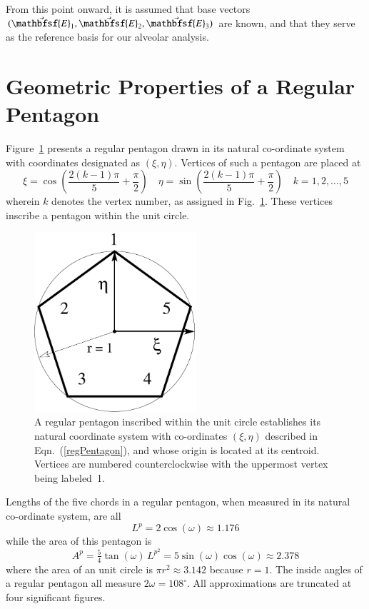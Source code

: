 From this point onward, it is assumed that base vectors $( \vec{\mathbfsf{E}}_1 , \vec{\mathbfsf{E}}_2 , \vec{\mathbfsf{E}}_3 )$ are known, and that they serve as the reference basis for our alveolar analysis.

\section{Geometric Properties of a Regular Pentagon}

Figure~\ref{figRegPentagon} presents a regular pentagon drawn in its natural co-ordinate system with co\-ordinates designated as $(\xi, \eta)$.  Vertices of such a pentagon are placed at
\begin{equation}
	\xi = \cos \left( \frac{2(k-1)\pi}{5} + \frac{\pi}{2} \right) \quad
	\eta = \sin \left( \frac{2(k-1)\pi}{5} + \frac{\pi}{2} \right) \quad
	k = 1, 2, \ldots, 5
	\label{regPentagon}
\end{equation}
wherein $k$ denotes the vertex number, as assigned in Fig.~\ref{figRegPentagon}.  These vertices inscribe a pentagon within the unit circle.

\begin{figure}
	\centering
	\includegraphics[width=6cm]{figures/regPentagon.pdf}
	\caption{A regular pentagon inscribed within the unit circle establishes its natural co\-ordinate system with co-ordinates $(\xi, \eta)$ described in Eqn.~(\ref{regPentagon}), and whose origin is located at its centroid.  Vertices are numbered counterclockwise with the uppermost vertex being labeled~1.}
	\label{figRegPentagon}
\end{figure}

Lengths of the five chords in a regular pentagon, when measured in its natural co-ordinate system, are all
\begin{equation}
	L^{\!p} = 2 \cos (\omega) \approx 1.176 
	\label{regPentagonLength}
\end{equation}
while the area of this pentagon is
\begin{equation}
	A^p = \tfrac{5}{4} \tan ( \omega ) \, L^{\!p^2} = 
	5 \sin (\omega) \cos (\omega) \approx 2.378
	\label{regPentagonArea}
\end{equation}
where the area of an unit circle is $\pi r^2 \approx 3.142$ because $r=1$.  The
inside angles of a regular pentagon all measure $2\omega = 108^{\circ}$.  All approximations are truncated at four significant figures.

